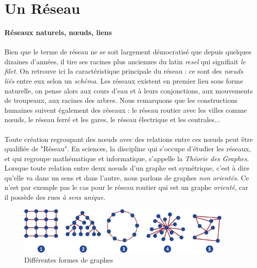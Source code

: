 \section{Un Réseau}

\paragraph{Réseaux naturels, n\oe{}uds, liens} \label{natural_networks}

\paragraph{} Bien que le terme de réseau ne se soit largement démocratisé que depuis quelques dizaines d'années, il tire ses
racines plus anciennes du latin \emph{resel} qui signifiait \emph{le filet}. On retrouve ici la caractéristique
principale du réseau : ce sont des \emph{n\oe{}uds liés} entre eux selon un \emph{schéma}. Les réseaux existent en
premier lieu sous forme naturelle, on pense alors aux cours d'eau et à leurs conjonctions, aux mouvements de troupeaux,
aux racines des arbres. Nous remarquons que les constructions humaines suivent également des réseaux : le réseau routier
avec les villes comme n\oe{}uds, le réseau ferré et les gares, le réseau électrique et les centrales...

\paragraph{} Toute création regroupant des n\oe{}uds avec des relations entre ces n\oe{}uds peut être qualifiée de "Réseau". En sciences,
la discipline qui s'occupe d'étudier les réseaux, et qui regroupe mathématique et informatique, s'appelle
la \emph{Théorie des Graphes}. Lorsque toute relation entre deux n\oe{}uds d'un graphe est symétrique, c'est à dire qu'elle va
dans un sens et dans l'autre, nous parlons de graphes \emph{non orientés}. Ce n'est par exemple pas le cas pour le
réseau routier qui est un graphe \emph{orienté}, car il possède des rues \emph{à sens unique}.

\begin{figure}[h]
    \centering
    \includegraphics[width=400px]{chapters/02/images/reseaux.png}
    \caption{\label{Réseaux, graphes} Différentes formes de graphes}
\end{figure}

